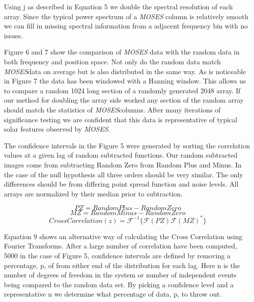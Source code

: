 \documentclass[]{aastex6}
\newcommand{\MOSES}{\textit{MOSES}}
\begin{document}
Using j as described in Equation 5 we double the spectral resolution of each array.  Since the typical power spectrum of a \textit{MOSES} column is relatively smooth we can fill in missing spectral information from a adjacent frequency bin with no issues.  

Figure 6 and 7 show the comparison of \textit{MOSES} data with the random data in both frequency and position space.  Not only do the random data match \MOSES data on average but is also distributed in the same way.  As is noticeable in Figure 7 the data has been windowed with a Hanning window.  This allows us to compare a random 1024 long section of a randomly generated 2048 array. If our method for doubling the array side worked any section of the random array should match the statistics of \MOSES columns. After many iterations of significance testing we are confident that this data is representative of typical solar features observed by \textit{MOSES}.

The confidence intervals in the Figure 5 were generated by sorting the correlation values at a given lag of random subtracted functions.  Our random subtracted images come from subtracting Random Zero from Random Plus and Minus. In the case of the null hypothesis all three orders should be very similar.  The only differences should be from differing point spread function and noise levels.  All arrays are normalized by their median prior to subtraction.

\begin{equation}
PZ =  RandomPlus - RandomZero
\end{equation}
\begin{equation*}
MZ = RandomMinus - RandomZero
\end{equation*}
\begin{equation}
CrossCorrelation (z) = \mathcal{F}^{-1} \lbrace \mathcal{F}(PZ) \mathcal{F}(MZ)^* \rbrace
\end{equation}

Equation 9 shows an alternative way of calculating the Cross Correlation using Fourier Transforms. After a large number of correlation have been computed, 5000 in the case of Figure 5, confidence intervals are defined by removing a percentage, p, of from either end of the distribution for each lag. Here n is the number of degrees of freedom in the system or number of independent events being compared to the random data set.  By picking a confidence level and a representative n we determine what percentage of data, p, to throw out.
\end{document}
